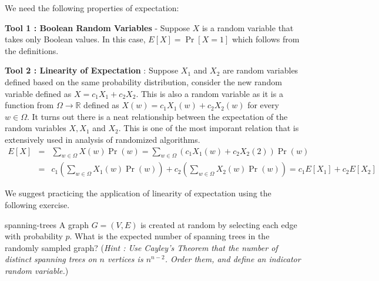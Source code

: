 We need the following properties of expectation:
\begin{description}
\item{\bf Tool 1 : Boolean Random Variables } - 
Suppose $X$ is a random variable that takes only Boolean values. In this case, $E[X] = \Pr[X=1]$ which follows from the definitions.
\item{\bf Tool 2 : Linearity of Expectation }: Suppose $X_1$ and $X_2$ are random variables defined based on the same probability distribution, consider the new random variable defined as $X = c_1X_1 + c_2X_2$. This is also a random variable as it is a function from $\Omega \to \mathbb{R}$ defined as $X(w) = c_1X_1(w)+c_2X_2(w)$ for every $w \in \Omega$. It turns out there is a neat relationship between the expectation of the random variables $X, X_1$ and $X_2$. This is one of the most imporant relation that is extensively used in analysis of randomized algorithms.
\begin{eqnarray*}
E[X] & = & \sum_{w \in \Omega} X(w)\Pr(w) = \sum_{w \in \Omega} \left( c_1X_1(w)+c_2X_2(2) \right) \Pr(w) \\
& = & c_1 \left( \sum_{w \in \Omega} X_1(w)\Pr(w)  \right)  + c_2 \left( \sum_{w \in \Omega} X_2(w) \Pr(w) \right)
= c_1E[X_1]+c_2E[X_2]
\end{eqnarray*}

We suggest practicing the application of linearity of expectation using the following exercise.
\begin{exercise-prob}
\begin{show-ps1}{spanning-trees}
A graph $G=(V,E)$ is created at random by selecting each edge with probability $p$.  What is the expected number of spanning trees in the randomly sampled graph?
(\textit{Hint : Use Cayley’s Theorem that the number of distinct spanning trees on $n$ vertices is $n^{n-2}$. Order them, and define an indicator random variable.})

\end{show-ps1}
\end{exercise-prob}


\end{description}
